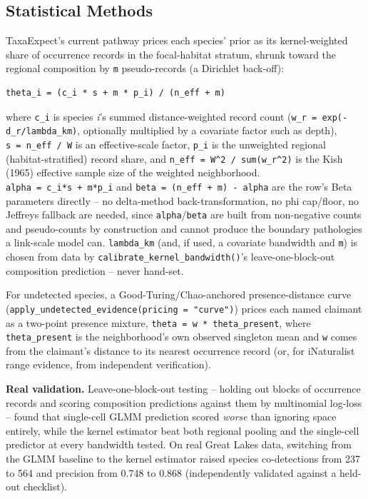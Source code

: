 \documentclass[
]{article}
\begin{document}
\subsection{Statistical Methods}\label{statistical-methods}

TaxaExpect's current pathway prices each species' prior as its
kernel-weighted share of occurrence records in the focal-habitat
stratum, shrunk toward the regional composition by \texttt{m}
pseudo-records (a Dirichlet back-off):

\begin{verbatim}
theta_i = (c_i * s + m * p_i) / (n_eff + m)
\end{verbatim}

where \texttt{c\_i} is species \emph{i}'s summed distance-weighted
record count (\texttt{w\_r\ =\ exp(-d\_r/lambda\_km)}, optionally
multiplied by a covariate factor such as depth),
\texttt{s\ =\ n\_eff\ /\ W} is an effective-scale factor, \texttt{p\_i}
is the unweighted regional (habitat-stratified) record share, and
\texttt{n\_eff\ =\ W\^{}2\ /\ sum(w\_r\^{}2)} is the Kish (1965)
effective sample size of the weighted neighborhood.
\texttt{alpha\ =\ c\_i*s\ +\ m*p\_i} and
\texttt{beta\ =\ (n\_eff\ +\ m)\ -\ alpha} are the row's Beta parameters
directly -- no delta-method back-transformation, no phi cap/floor, no
Jeffreys fallback are needed, since \texttt{alpha}/\texttt{beta} are
built from non-negative counts and pseudo-counts by construction and
cannot produce the boundary pathologies a link-scale model can.
\texttt{lambda\_km} (and, if used, a covariate bandwidth and \texttt{m})
is chosen from data by \texttt{calibrate\_kernel\_bandwidth()}'s
leave-one-block-out composition prediction -- never hand-set.

For undetected species, a Good-Turing/Chao-anchored presence-distance
curve (\texttt{apply\_undetected\_evidence(pricing\ =\ "curve")}) prices
each named claimant as a two-point presence mixture,
\texttt{theta\ =\ w\ *\ theta\_present}, where \texttt{theta\_present}
is the neighborhood's own observed singleton mean and \texttt{w} comes
from the claimant's distance to its nearest occurrence record (or, for
iNaturalist range evidence, from independent verification).

\textbf{Real validation.} Leave-one-block-out testing -- holding out
blocks of occurrence records and scoring composition predictions against
them by multinomial log-loss -- found that single-cell GLMM prediction
scored \emph{worse} than ignoring space entirely, while the kernel
estimator beat both regional pooling and the single-cell predictor at
every bandwidth tested. On real Great Lakes data, switching from the
GLMM baseline to the kernel estimator raised species co-detections from
237 to 564 and precision from 0.748 to 0.868 (independently validated
against a held-out checklist).
\end{document}
